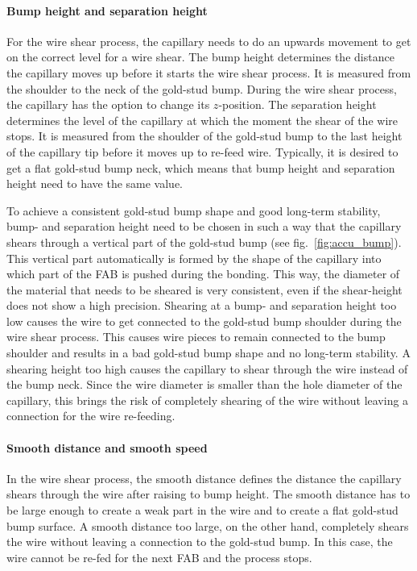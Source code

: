 \paragraph*{Bump height and separation height}
For the wire shear process, the capillary needs to do an upwards movement to get on the correct level for a wire shear. The bump height determines the distance the capillary moves up before it starts the wire shear process. It is measured from the shoulder to the neck of the gold-stud bump. During the wire shear process, the capillary has the option to change its $z$-position. The separation height determines the level of the capillary at which the moment the shear of the wire stops. It is measured from the shoulder of the gold-stud bump to the last height of the capillary tip before it moves up to re-feed wire. Typically, it is desired to get a flat gold-stud bump neck, which means that bump height and separation height need to have the same value.

To achieve a consistent gold-stud bump shape and good long-term stability, bump- and separation height need to be chosen in such a way that the capillary shears through a vertical part of the gold-stud bump (see fig.~\ref{fig:accu_bump}). This vertical part automatically is formed by the shape of the capillary into which part of the \ac{FAB} is pushed during the bonding. This way, the diameter of the material that needs to be sheared is very consistent, even if the shear-height does not show a high precision. Shearing at a bump- and separation height too low causes the wire to get connected to the gold-stud bump shoulder during the wire shear process. This causes wire pieces to remain connected to the bump shoulder and results in a bad gold-stud bump shape and no long-term stability. A shearing height too high causes the capillary to shear through the wire instead of the bump neck. Since the wire diameter is smaller than the hole diameter of the capillary, this brings the risk of completely shearing of the wire without leaving a connection for the wire re-feeding.


\paragraph*{Smooth distance and smooth speed}
In the wire shear process, the smooth distance defines the distance the capillary shears through the wire after raising to bump height. The smooth distance has to be large enough to create a weak part in the wire and to create a flat gold-stud bump surface. A smooth distance too large, on the other hand, completely shears the wire without leaving a connection to the gold-stud bump. In this case, the wire cannot be re-fed for the next \ac{FAB} and the process stops.

